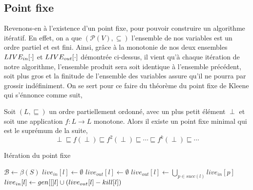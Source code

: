 \documentclass[a4paper, 12pt]{article}
\begin{document}
\subsection{Point fixe}
Revenons-en à l'existence d'un point fixe, pour pouvoir construire un algorithme itératif. En effet,
on a que $(\mathcal{P}(V), \subseteq)$ l'ensemble de nos variables est un ordre partiel et est fini.
Ainsi, grâce à la monotonie de nos deux ensembles $LIVE_{in}[\cdot]$ et $LIVE_{out}[\cdot]$ démontrée ci-dessus, il
vient qu'à chaque itération de notre algorithme, l'ensemble produit sera soit identique à l'ensemble précédent,
soit plus gros et la finitude de l'ensemble des variables assure qu'il ne pourra par grossir indéfiniment. On se sert pour ce faire
du théorème du point fixe de Kleene qui s'énnonce comme suit,
\newline
\newline
\begin{theorem}	
	Soit $(L, \sqsubseteq)$ un ordre partiellement ordonné, avec un plus petit élément  $\perp$ et soit
	une application $f : L \longrightarrow L$ monotone. Alors il existe un point fixe minimal qui est le suprémum de la suite,
	\[\perp \sqsubseteq f(\perp) \sqsubseteq f^2(\perp) \sqsubseteq \cdots \sqsubseteq f^k(\perp) \sqsubseteq \cdots\]
\end{theorem}

\begin{algorithm}
	\caption{Itération du point fixe}
	\begin{algorithmic}
		\State $\mathcal{B} \leftarrow \beta(S)$
		\State $live_{in}[l] \leftarrow \emptyset$
		\State $live_{out}[l] \leftarrow \emptyset$
		\EndFor
		\State $live_{out}[l] \leftarrow \bigcup\limits_{p\in succ(l)} live_{in}[p]$
		\State $live_{in}[l] \leftarrow gen[[]l] \cup (live_{out}[l] - kill[l])$
		\EndFor
		\EndWhile
	\end{algorithmic}
\end{algorithm}
\end{document}
